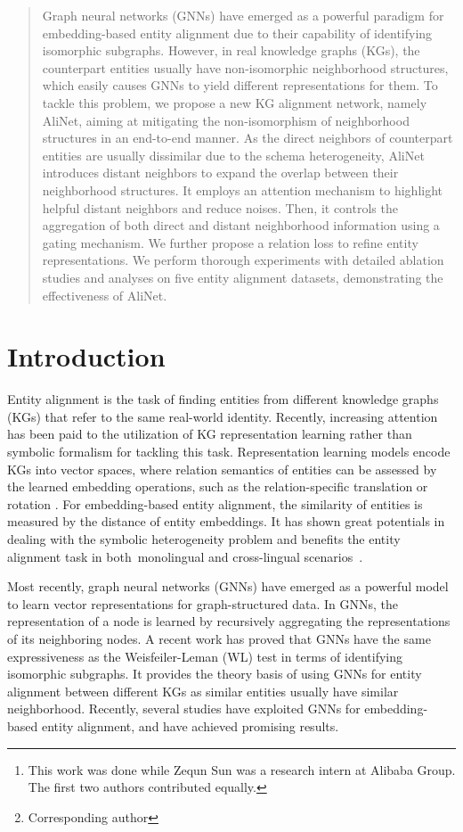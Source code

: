 \documentclass[letterpaper]{article} \usepackage{aaai20}  \usepackage{times}  \usepackage{helvet} \usepackage{courier}  \usepackage[hyphens]{url}  \usepackage{graphicx} \urlstyle{rm} \def\UrlFont{\rm}  \frenchspacing  \setlength{\pdfpagewidth}{8.5in}  \setlength{\pdfpageheight}{11in}  \usepackage{amsmath}
\author{
		Zequn Sun\textsuperscript{\rm 1}\footnotemark[1],
		Chengming Wang\textsuperscript{\rm 1}\thanks{This work was done while Zequn Sun was a research intern at Alibaba Group. The first two authors contributed equally.},
		Wei Hu\textsuperscript{\rm 1}\thanks{Corresponding author},
		Muhao Chen\textsuperscript{\rm 2},
		Jian Dai\textsuperscript{\rm 3},
		Wei Zhang\textsuperscript{\rm 3},
		Yuzhong Qu\textsuperscript{\rm 1} \\
	\textsuperscript{\rm 1}State Key Laboratory for Novel Software Technology, Nanjing University, China\\
	\textsuperscript{\rm 2}Department of Computer Science, University of California, Los Angeles, USA \\
	\textsuperscript{\rm 3}Alibaba Group, China \\
	\{zqsun,cmwang\}.nju@gmail.com, \{whu, yzqu\}@nju.edu.cn, muhaochen@ucla.edu, \{yiding.dj, lantu.zw\}@alibaba-inc.com
}
\begin{document}
\maketitle

\begin{abstract}
Graph neural networks (GNNs) have emerged as a powerful paradigm for embedding-based entity alignment due to their capability of identifying isomorphic subgraphs. However, in real knowledge graphs (KGs), the counterpart entities usually have non-isomorphic neighborhood structures, which easily causes GNNs to yield different representations for them. To tackle this problem, we propose a new KG alignment network, namely AliNet, aiming at mitigating the non-isomorphism of neighborhood structures in an end-to-end manner. As the direct neighbors of counterpart entities are usually dissimilar due to the schema heterogeneity, AliNet introduces distant neighbors to expand the overlap between their neighborhood structures. It employs an attention mechanism to highlight helpful distant neighbors and reduce noises. Then, it controls the aggregation of both direct and distant neighborhood information using a gating mechanism. We further propose a relation loss to refine entity representations. We perform thorough experiments with detailed ablation studies and analyses on five entity alignment datasets, demonstrating the effectiveness of AliNet.
\end{abstract}

\section{Introduction}
Entity alignment is the task of finding entities from different knowledge graphs (KGs) that refer to the same real-world identity. Recently, increasing attention has been paid to the utilization of KG representation learning rather than symbolic formalism for tackling this task. Representation learning models encode KGs into vector spaces, where relation semantics of entities can be assessed by the learned embedding operations, such as the relation-specific translation \cite{TransE} or rotation \cite{RotatE}. For embedding-based entity alignment, the similarity of entities is measured by the distance of entity embeddings. It has shown great potentials in dealing with the symbolic heterogeneity problem and benefits the entity alignment task in both~monolingual and cross-lingual scenarios~\cite{IPTransE,MTransE}.

Most recently, graph neural networks (GNNs) \cite{GCN,GAT,MixHop} have emerged as a powerful model to learn vector representations for graph-structured data. In GNNs, the representation of a node is learned by recursively aggregating the representations of its neighboring nodes. A recent work \cite{K-GNN} has proved that GNNs have the same expressiveness as the Weisfeiler-Leman (WL) test \cite{WL} in terms of identifying isomorphic subgraphs. It provides the theory basis of using GNNs for entity alignment between different KGs as similar entities usually have similar neighborhood. Recently, several studies \cite{GCN_Align,KGMatching,MuGNN,RDGCN,AVR-GCN} have exploited GNNs for embedding-based entity alignment, and have achieved promising results. 
\end{document}
